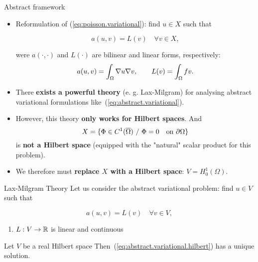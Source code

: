 \begin{frame}{Abstract framework}
  \begin{itemize}
  \item Reformulation of (\ref{eq:poisson.variational}): find
    $u\in X$ such that
    \begin{BlockNoTitle}
      \begin{equation}
        \tag{PA}
        a(u,v) = L(v) \quad \forall v\in
        X,\label{eq:abstract.variational}
      \end{equation}
    \end{BlockNoTitle}
    were $a(\cdot,\cdot)$ and $L(\cdot)$ are bilinear and linear forms,
    respectively:
    \begin{equation*}
      a(u,v) = \int_\Omega \nabla u \nabla v, \qquad
      L(v) = \int_\Omega f  v.
    \end{equation*}

  \item There \textbf{exists a powerful theory}
    {\color{PHDgray}(e. g. Lax-Milgram)} for analysing abstract variational
    formulations like~(\ref{eq:abstract.variational}).

  \item However, this theory \textbf{only works for Hilbert spaces}. And
    $$
    X=\{ \Phi\in C^1(\overline\Omega) \ / \  \Phi=0 \quad \mbox{on } \partial\Omega\}
    $$
    is \textbf{not a Hilbert space} (equipped with  the "natural" scalar product for this problem).
  \item We therefore must \textbf{replace $X$ with a Hilbert space}: $V=H_0^1(\Omega)$.
  \end{itemize}

\end{frame}

\begin{frame}{Lax-Milgram Theory}
  Let us consider the abstract variational problem: find $u\in V$ such that
    \begin{BlockNoTitle}
      \begin{equation}
        \tag{PA}
        a(u,v) = L(v) \quad \forall v\in V,
        \label{eq:abstract.variational.hilbert}
      \end{equation}
    \end{BlockNoTitle}
    \begin{enumerate}
    \item $L: V \to {\mathbb R}$ is linear and continuous
    \end{enumerate}
    \begin{theorem}
      Let $V$ be a real Hilbert space
      Then~(\ref{eq:abstract.variational.hilbert})
      has a unique solution.
    \end{theorem}
\end{frame}

